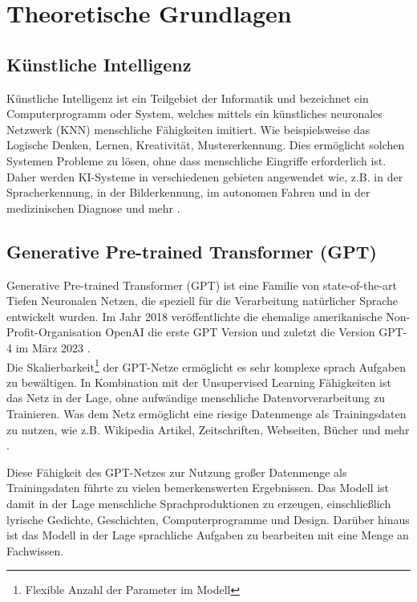 \newpage
\chapter{Theoretische Grundlagen}
\label{sec:grundl}

\section{Künstliche Intelligenz}
Künstliche Intelligenz ist ein Teilgebiet der Informatik und bezeichnet ein Computerprogramm oder System, welches mittels ein künstliches neuronales Netzwerk (KNN) menschliche Fähigkeiten imitiert. Wie beispielsweise das Logische Denken, Lernen, Kreativität, Mustererkennung. Dies ermöglicht solchen Systemen Probleme zu lösen, ohne dass menschliche Eingriffe erforderlich ist. Daher werden KI-Systeme in verschiedenen gebieten angewendet wie, z.B. in der Spracherkennung, in der Bilderkennung, im autonomen Fahren und in der medizinischen Diagnose und mehr \cite{doc:ki}. \\


\section{Generative Pre-trained Transformer (GPT)} \label{GPT}
Generative Pre-trained Transformer (GPT) ist eine Familie von state-of-the-art Tiefen Neuronalen Netzen, die speziell für die Verarbeitung natürlicher Sprache entwickelt wurden. Im Jahr 2018 veröffentlichte die ehemalige amerikanische Non-Profit-Organisation OpenAI die erste GPT Version und zuletzt die Version GPT-4 im März 2023 \cite{doc:DBLP,doc:GPT3,doc:GPT4}. \\ 

Die Skalierbarkeit\footnote{Flexible Anzahl der Parameter im Modell} der GPT-Netze  ermöglicht es sehr komplexe sprach Aufgaben zu bewältigen. In Kombination mit der Unsupervised Learning Fähigkeiten ist das Netz in der Lage, ohne aufwändige menschliche Datenvorverarbeitung zu Trainieren. Was dem Netz ermöglicht eine riesige Datenmenge als Trainingsdaten zu nutzen, wie z.B. Wikipedia Artikel, Zeitschriften, Webseiten, Bücher und mehr \cite{doc:DBLP}.  

Diese Fähigkeit des GPT-Netzes zur Nutzung großer Datenmenge als Trainingsdaten führte zu vielen bemerkenswerten Ergebnissen. Das Modell ist damit in der Lage menschliche Sprachproduktionen zu erzeugen, einschließlich lyrische Gedichte, Geschichten, Computerprogramme und Design. Darüber hinaus ist das Modell in der Lage sprachliche Aufgaben zu bearbeiten mit eine Menge an Fachwissen.

